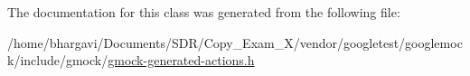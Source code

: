 The documentation for this class was generated from the following file\+:\begin{DoxyCompactItemize}
\item 
/home/bhargavi/\+Documents/\+S\+D\+R/\+Copy\+\_\+\+Exam\+\_\+X/vendor/googletest/googlemock/include/gmock/\hyperlink{gmock-generated-actions_8h}{gmock-\/generated-\/actions.\+h}\end{DoxyCompactItemize}
